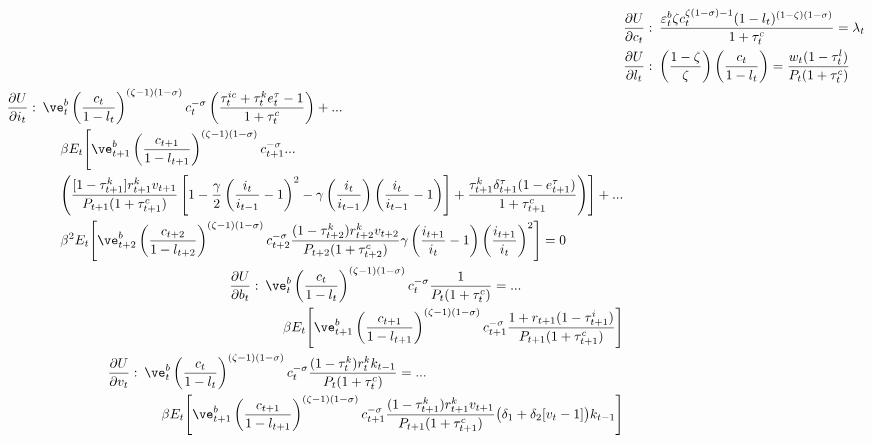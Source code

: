 \begin{align}
& \frac{\partial U}{\partial c_{t}}:\: \frac{\varepsilon_{t}^{b}\zeta c_{t}^{\zeta(1-\sigma)-1}(1-l_{t})^{(1-\zeta)(1-\sigma)}}{1+\tau_{t}^{c}} = \lambda_{t} \label{EqFOCc} \\
   & \frac{\partial U}{\partial l_{t}}:\: \left(\frac{1-\zeta}{\zeta}\right)\left(\frac{c_t}{1-l_t}\right) = \frac{w_{t}(1-\tau_{t}^{l})}{P_{t}(1+\tau_{t}^{c})} \label{EqFOCl} \\
      \begin{split}
      &\frac{\partial U}{\partial i_{t}}:\: \ve_{t}^b\left(\frac{c_{t}}{1-l_{t}}\right)^{(\zeta-1)(1-\sigma)}c_{t}^{-\sigma}\left(\frac{\tau_{t}^{ic}+\tau_{t}^{k}e_{t}^{\tau} - 1}{1+\tau_{t}^{c}}\right) + ... \\
      &\quad\quad\quad\quad \beta E_{t}\Biggl[\ve_{t+1}^b\left(\frac{c_{t+1}}{1-l_{t+1}}\right)^{(\zeta-1)(1-\sigma)}c_{t+1}^{-\sigma}... \\
      &\quad\quad\quad\quad \Biggl(\frac{[1-\tau_{t+1}^k]r_{t+1}^k v_{t+1}}{P_{t+1}(1+\tau_{t+1}^c)}\left[1-\frac{\gamma}{2}\left(\frac{i_{t}}{i_{t-1}}-1\right)^2 - \gamma\left(\frac{i_{t}}{i_{t-1}}\right)\left(\frac{i_{t}}{i_{t-1}}-1\right)\right] + \frac{\tau_{t+1}^k\delta_{t+1}^\tau(1-e_{t+1}^\tau)}{1+\tau_{t+1}^c}\Biggr)\Biggr] + ... \\
      &\quad\quad\quad\quad \beta^{2}E_{t}\Biggl[\ve_{t+2}^b\left(\frac{c_{t+2}}{1-l_{t+2}}\right)^{(\zeta-1)(1-\sigma)}c_{t+2}^{-\sigma}\frac{(1-\tau_{t+2}^k)r_{t+2}^k v_{t+2}}{P_{t+2}(1+\tau_{t+2}^c)}\gamma\left(\frac{i_{t+1}}{i_{t}}-1\right)\left(\frac{i_{t+1}}{i_{t}}\right)^{2}\Biggr]= 0
   \end{split} \label{EqFOCi} \\
   \begin{split}
      &\frac{\partial U}{\partial b_{t}}:\: \ve_{t}^b\left(\frac{c_{t}}{1-l_{t}}\right)^{(\zeta-1)(1-\sigma)}c_{t}^{-\sigma}\frac{1}{P_t(1+\tau_t^c)} = ... \\
      &\quad\quad\quad\quad \beta E_t\Biggl[\ve_{t+1}^b\left(\frac{c_{t+1}}{1-l_{t+1}}\right)^{(\zeta-1)(1-\sigma)}c_{t+1}^{-\sigma}\frac{1+r_{t+1}(1-\tau_{t+1}^i)}{P_{t+1}(1+\tau_{t+1}^c)}\Biggr]
   \end{split} \label{EqFOCb} \\
   \begin{split}
      &\frac{\partial U}{\partial v_{t}}:\: \ve_{t}^b\left(\frac{c_{t}}{1-l_{t}}\right)^{(\zeta-1)(1-\sigma)}c_{t}^{-\sigma}\frac{(1-\tau_t^k)r_t^k k_{t-1}}{P_{t}(1+\tau_t^c)} = ... \\
      &\quad\quad\quad\quad \beta E_t\Biggl[\ve_{t+1}^b\left(\frac{c_{t+1}}{1-l_{t+1}}\right)^{(\zeta-1)(1-\sigma)}c_{t+1}^{-\sigma}\frac{(1-\tau_{t+1}^k)r_{t+1}^k v_{t+1}}{P_{t+1}(1+\tau_{t+1}^c)}\bigl(\delta_1 + \delta_2[v_t - 1]\bigr)k_{t-1}\Biggr]
   \end{split}  \label{EqFOCv}\\
\end{align}


